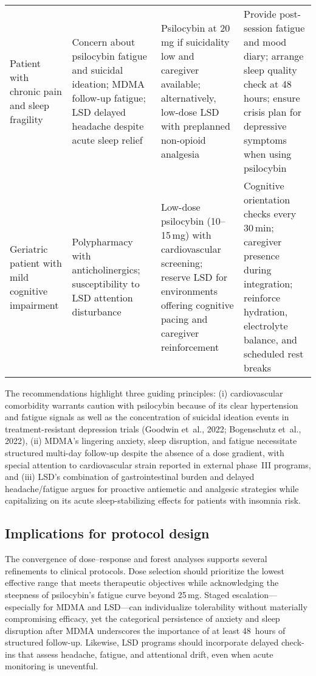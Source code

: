 \begin{table}[htbp]
{\begin{tabular}{p{}p{}p{}p{}}
    Patient with chronic pain and sleep fragility & Concern about psilocybin fatigue and suicidal ideation; MDMA follow-up fatigue; LSD delayed headache despite acute sleep relief & Psilocybin at 20\,mg if suicidality low and caregiver available; alternatively, low-dose LSD with preplanned non-opioid analgesia & Provide post-session fatigue and mood diary; arrange sleep quality check at 48 hours; ensure crisis plan for depressive symptoms when using psilocybin \\
    Geriatric patient with mild cognitive impairment & Polypharmacy with anticholinergics; susceptibility to LSD attention disturbance & Low-dose psilocybin (10--15\,mg) with cardiovascular screening; reserve LSD for environments offering cognitive pacing and caregiver reinforcement & Cognitive orientation checks every 30\,min; caregiver presence during integration; reinforce hydration, electrolyte balance, and scheduled rest breaks \\
    \bottomrule
  \end{tabular}}
\end{table}

The recommendations highlight three guiding principles: (i) cardiovascular comorbidity warrants caution with psilocybin because of its clear hypertension and fatigue signals as well as the concentration of suicidal ideation events in treatment-resistant depression trials (Goodwin et~al., 2022; Bogenschutz et~al., 2022), (ii) MDMA’s lingering anxiety, sleep disruption, and fatigue necessitate structured multi-day follow-up despite the absence of a dose gradient, with special attention to cardiovascular strain reported in external phase~III programs, and (iii) LSD’s combination of gastrointestinal burden and delayed headache/fatigue argues for proactive antiemetic and analgesic strategies while capitalizing on its acute sleep-stabilizing effects for patients with insomnia risk.

\subsection{Implications for protocol design}

The convergence of dose--response and forest analyses supports several refinements to clinical protocols.
Dose selection should prioritize the lowest effective range that meets therapeutic objectives while acknowledging the steepness of psilocybin’s fatigue curve beyond 25\,mg.
Staged escalation---especially for MDMA and LSD---can individualize tolerability without materially compromising efficacy, yet the categorical persistence of anxiety and sleep disruption after MDMA underscores the importance of at least 48~hours of structured follow-up.
Likewise, LSD programs should incorporate delayed check-ins that assess headache, fatigue, and attentional drift, even when acute monitoring is uneventful.

